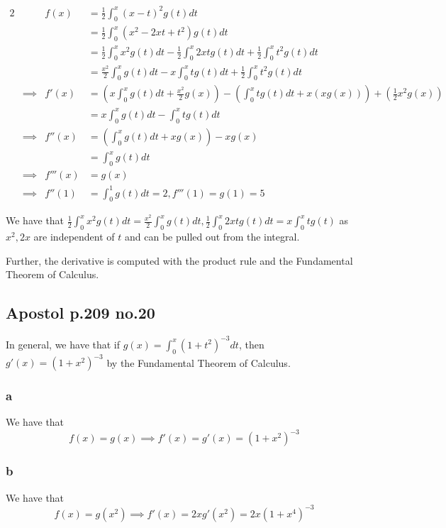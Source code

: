 \documentclass[12pt,letterpaper]{article}
\theoremstyle{definition}
\begin{document}
\begin{alignat*}{2}
  && f(x) &= \frac{1}{2} \int_0^x(x-t)^2g(t)dt \\
  && &= \frac{1}{2}\int_0^x(x^2 - 2xt + t^2)g(t)dt \\
  && &= \frac{1}{2}\int_0^xx^2g(t)dt - \frac{1}{2}\int_0^x2xtg(t)dt + \frac{1}{2}\int_0^xt^2g(t)dt \\
  && &= \frac{x^2}{2}\int_0^xg(t)dt - x\int_0^xtg(t)dt +
  \frac{1}{2}\int_0^xt^2g(t)dt \\
  &\implies& f'(x) &= (x\int_0^xg(t)dt + \frac{x^2}{2}g(x)) - (\int_0^xtg(t)dt +
  x(xg(x))) + (\frac{1}{2}x^2g(x)) \\
  && &= x\int_0^xg(t)dt - \int_0^xtg(t)dt \\
  &\implies& f''(x) &= (\int_0^xg(t)dt + xg(x)) - xg(x) \\
  && &= \int_0^xg(t)dt \\
  &\implies& f'''(x) &= g(x) \\
  &\implies& f''(1) &= \int_0^1g(t)dt = 2, f'''(1) = g(1) = 5
\end{alignat*}

We have that $\frac{1}{2}\int_0^xx^2g(t)dt = \frac{x^2}{2}\int_0^xg(t)dt,
\frac{1}{2}\int_0^x2xtg(t)dt = x\int_0^xtg(t)$ as $x^2, 2x$ are independent of
$t$ and can be pulled out from the integral.

Further, the derivative is computed with the product rule and the Fundamental
Theorem of Calculus.

\subsection*{Apostol p.209 no.20}

In general, we have that if $g(x) = \int_0^x(1+t^2)^{-3}dt$, then $g'(x) =
(1+x^2)^{-3}$ by the Fundamental Theorem of Calculus.

\subsubsection*{a}

We have that
\[
  f(x) = g(x) \implies f'(x) = g'(x) = (1+x^2)^{-3}
\]

\subsubsection*{b}

We have that
\[
  f(x) = g(x^2) \implies f'(x) = 2xg'(x^2) = 2x(1 + x^4)^{-3}
\]
\end{document}
